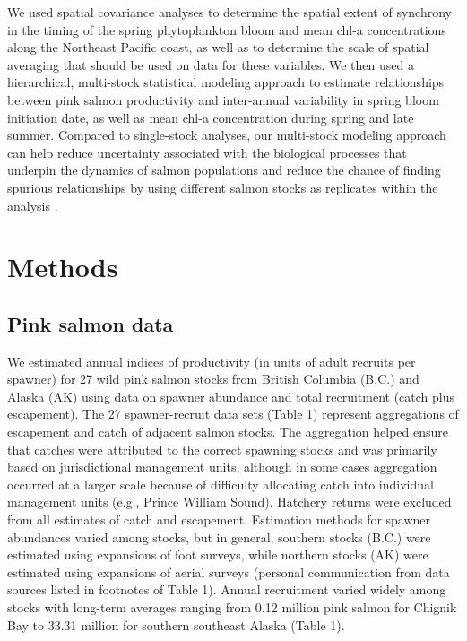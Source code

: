 We used spatial covariance analyses to determine the spatial extent of synchrony
in the timing of the spring phytoplankton bloom and mean chl-a concentrations
along the Northeast Pacific coast, as well as to determine the scale of spatial
averaging that should be used on data for these variables. We then used a
hierarchical, multi-stock statistical modeling approach to estimate
relationships between pink salmon productivity and inter-annual variability in
spring bloom initiation date, as well as mean chl-a concentration during spring
and late summer.  Compared to single-stock analyses, our multi-stock modeling
approach can help reduce uncertainty associated with the biological processes
that underpin the dynamics of salmon populations and reduce the chance of
finding spurious relationships by using different salmon stocks as replicates
within the analysis \citep{Myers1998c, Myers1999a}.


\section{Methods}

\subsection{Pink salmon data}

We estimated annual indices of productivity (in units of adult recruits per
spawner) for 27 wild pink salmon stocks from British Columbia (B.C.) and Alaska
(AK) using data on spawner abundance and total recruitment (catch plus
escapement). The 27 spawner-recruit data sets (Table 1) represent aggregations
of escapement and catch of adjacent salmon stocks. The aggregation helped ensure
that catches were attributed to the correct spawning stocks and was primarily
based on jurisdictional management units, although in some cases aggregation
occurred at a larger scale because of difficulty allocating catch into
individual management units (e.g., Prince William Sound). Hatchery returns were
excluded from all estimates of catch and escapement. Estimation methods for
spawner abundances varied among stocks, but in general, southern stocks (B.C.)
were estimated using expansions of foot surveys, while northern stocks (AK) were
estimated using expansions of aerial surveys (personal communication from data
sources listed in footnotes of Table 1). Annual recruitment varied widely among
stocks with long-term averages ranging from 0.12 million pink salmon for Chignik
Bay to 33.31 million for southern southeast Alaska (Table 1).

